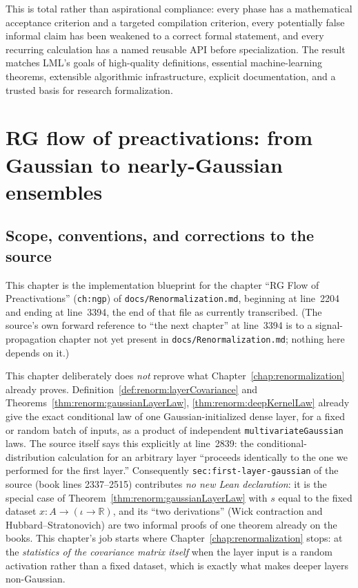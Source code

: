 This is total rather than aspirational compliance: every phase has a mathematical acceptance
criterion and a targeted compilation criterion, every potentially false informal claim has been
weakened to a correct formal statement, and every recurring calculation has a named reusable API
before specialization.  The result matches LML's goals of high-quality definitions, essential
machine-learning theorems, extensible algorithmic infrastructure, explicit documentation, and a
trusted basis for research formalization.

\chapter{RG flow of preactivations: from Gaussian to nearly-Gaussian ensembles}
\label{chap:rg-flow-preactivations}

\section{Scope, conventions, and corrections to the source}

This chapter is the implementation blueprint for the chapter ``RG Flow of Preactivations''
(\texttt{ch:ngp}) of \texttt{docs/Renormalization.md}, beginning at line~2204 and ending at
line~3394, the end of that file as currently transcribed.  (The source's own forward reference to
``the next chapter'' at line~3394 is to a signal-propagation chapter not yet present in
\texttt{docs/Renormalization.md}; nothing here depends on it.)

This chapter deliberately does \emph{not} reprove what Chapter~\ref{chap:renormalization} already
proves.  Definition~\ref{def:renorm:layerCovariance} and
Theorems~\ref{thm:renorm:gaussianLayerLaw}, \ref{thm:renorm:deepKernelLaw} already give the exact
conditional law of one Gaussian-initialized dense layer, for a fixed or random batch of inputs,
as a product of independent \texttt{multivariateGaussian} laws.  The source itself says this
explicitly at line~2839: the conditional-distribution calculation for an arbitrary layer ``proceeds
identically to the one we performed for the first layer.''  Consequently
\texttt{sec:first-layer-gaussian} of the source (book lines 2337--2515) contributes \emph{no new
Lean declaration}: it is the
special case of Theorem~\ref{thm:renorm:gaussianLayerLaw} with $s$ equal to the fixed dataset
$x:A\to(\iota\to\mathbb R)$, and its ``two derivations'' (Wick contraction and
Hubbard--Stratonovich) are two informal proofs of one theorem already on the books.  This
chapter's job starts where Chapter~\ref{chap:renormalization} stops: at the \emph{statistics of
the covariance matrix itself} when the layer input is a random activation rather than a fixed
dataset, which is exactly what makes deeper layers non-Gaussian.

